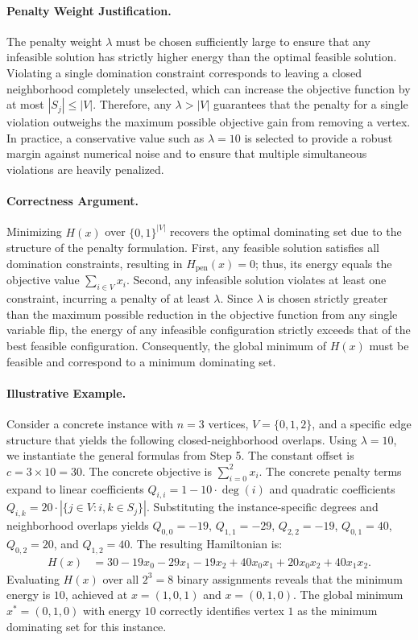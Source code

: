\documentclass[12pt]{article}
\begin{document}
\paragraph{Penalty Weight Justification.}
The penalty weight $\lambda$ must be chosen sufficiently large to ensure that any infeasible solution has strictly higher energy than the optimal feasible solution. Violating a single domination constraint corresponds to leaving a closed neighborhood completely unselected, which can increase the objective function by at most $|S_j| \le |V|$. Therefore, any $\lambda > |V|$ guarantees that the penalty for a single violation outweighs the maximum possible objective gain from removing a vertex. In practice, a conservative value such as $\lambda = 10$ is selected to provide a robust margin against numerical noise and to ensure that multiple simultaneous violations are heavily penalized.

\paragraph{Correctness Argument.}
Minimizing $H(x)$ over $\{0,1\}^{|V|}$ recovers the optimal dominating set due to the structure of the penalty formulation. First, any feasible solution satisfies all domination constraints, resulting in $H_{\text{pen}}(x) = 0$; thus, its energy equals the objective value $\sum_{i \in V} x_i$. Second, any infeasible solution violates at least one constraint, incurring a penalty of at least $\lambda$. Since $\lambda$ is chosen strictly greater than the maximum possible reduction in the objective function from any single variable flip, the energy of any infeasible configuration strictly exceeds that of the best feasible configuration. Consequently, the global minimum of $H(x)$ must be feasible and correspond to a minimum dominating set.

\paragraph{Illustrative Example.}
Consider a concrete instance with $n=3$ vertices, $V=\{0,1,2\}$, and a specific edge structure that yields the following closed-neighborhood overlaps. Using $\lambda=10$, we instantiate the general formulas from Step 5. The constant offset is $c = 3 \times 10 = 30$. The concrete objective is $\sum_{i=0}^2 x_i$. The concrete penalty terms expand to linear coefficients $Q_{i,i} = 1 - 10 \cdot \deg(i)$ and quadratic coefficients $Q_{i,k} = 20 \cdot |\{j \in V : i,k \in S_j\}|$. Substituting the instance-specific degrees and neighborhood overlaps yields $Q_{0,0}=-19$, $Q_{1,1}=-29$, $Q_{2,2}=-19$, $Q_{0,1}=40$, $Q_{0,2}=20$, and $Q_{1,2}=40$. The resulting Hamiltonian is:
\begin{align}
    H(x) &= 30 - 19x_0 - 29x_1 - 19x_2 + 40x_0x_1 + 20x_0x_2 + 40x_1x_2.
\end{align}
Evaluating $H(x)$ over all $2^3=8$ binary assignments reveals that the minimum energy is $10$, achieved at $x=(1,0,1)$ and $x=(0,1,0)$. The global minimum $x^*=(0,1,0)$ with energy $10$ correctly identifies vertex $1$ as the minimum dominating set for this instance.
\end{document}
